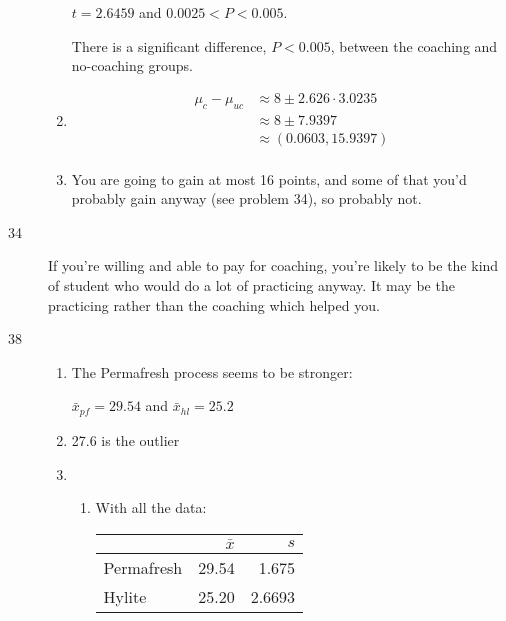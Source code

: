 \documentclass[letterpaper, landscape]{exam}
\begin{document}
\begin{description}
\begin{enumerate}[label = {(\alph*)}]
            $t = 2.6459$ and $0.0025 < P < 0.005$. 

            There is a significant difference, $P < 0.005$, between the
            coaching and no-coaching groups.

          \item 
            \begin{align*}
              \mu_{c} - \mu_{uc} & \approx 8 \pm 2.626 \cdot 3.0235 \\
                                 & \approx \boxed{ 8 \pm 7.9397 } \\
                                 & \approx \boxed{ (0.0603, 15.9397) } \\
            \end{align*}

          \item You are going to gain at most 16 points, and some of that you'd
            probably gain anyway (see problem 34), so probably not.

        \end{enumerate}

      \item[34] If you're willing and able to pay for coaching, you're likely to
        be the kind of student who would do a lot of practicing anyway. It may be
        the practicing rather than the coaching which helped you.

      \item[38]
        \begin{enumerate}[label = {(\alph*)}]
          \item 
            The Permafresh process seems to be stronger: 
            
            $\bar{x}_{pf} = 29.54$ and $\bar{x}_{hl} = 25.2$ 

          \item 27.6 is the outlier

          \item 

            \begin{enumerate}[label = {(\roman*)}]
              \item With all the data:

                \begin{tabular}[H]{lrr}
                  \toprule
                             & $\bar{x}$ & $s$ \\
                  \midrule
                  Permafresh & 29.54     & 1.675 \\
                  Hylite     & 25.20     & 2.6693 \\
                  \bottomrule
                \end{tabular}


\end{enumerate}
\end{enumerate}
\end{description}
\end{document}
